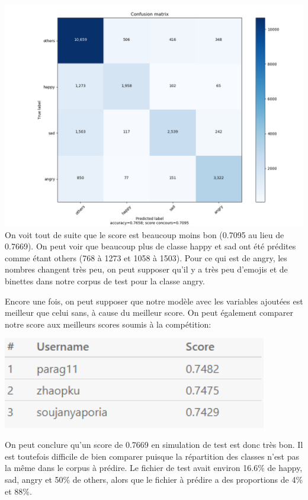 \documentclass[12pt,french]{article}
\begin{document}
\includegraphics[width=\linewidth,keepaspectratio]{confusion_matrix_sans_features}
On voit tout de suite que le score est beaucoup moins bon (0.7095 au lieu de 0.7669). On peut voir que beaucoup plus de classe happy et sad ont été prédites comme étant others (768 à 1273 et 1058 à 1503). Pour ce qui est de angry, les nombres changent très peu, on peut  supposer qu'il y a très peu d'emojis et de binettes dans notre corpus de test pour la classe angry.

Encore une fois, on peut supposer que notre modèle avec les variables ajoutées est meilleur que celui sans, à cause du meilleur score. On peut également comparer notre score aux meilleurs scores soumis à la compétition:

\includegraphics[width=\linewidth,height=4cm,keepaspectratio]{meilleurs_scores}

On peut conclure qu'un score de 0.7669 en simulation de test est donc très bon. Il est toutefois difficile de bien comparer puisque la répartition des classes n'est pas la même dans le corpus à prédire. Le fichier de test avait environ 16.6\% de happy, sad, angry et 50\% de others, alors que le fichier à prédire a des proportions de 4\% et 88\%. 
\end{document}
